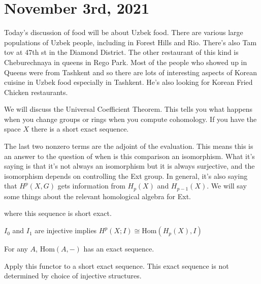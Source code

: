 \documentclass[10pt]{article}
\theoremstyle{definition}
\begin{document}
	\section{November 3rd, 2021}
		Today's discussion of food will be about Uzbek food. There are various large populations of Uzbek people, including in Forest Hills and Rio. There's also Tam tov at 47th st in the Diamond District. The other restaurant of this kind is Cheburechnaya in queens in Rego Park. Most of the people who showed up in Queens were from Tashkent and so there are lots of interesting aspects of Korean cuisine in Uzbek food especially in Tashkent. He's also looking for Korean Fried Chicken restaurants. 
	
	We will discuss the Universal Coefficient Theorem. This tells you what happens when you change groups or rings when you compute cohomology. If you have the space $X$ there is a short exact sequence.
	\begin{center}
	\end{center}
	The last two nonzero terms are the adjoint of the evaluation. This means this is an answer to the question of when is this comparison an isomorphism. What it's saying is that it's not always an isomorphism but it is always surjective, and the isomorphism depends on controlling the Ext group. In general, it's also saying that $H^p(X,G)$ gets information from $H_p(X)$ and $H_{p-1}(X)$. We will say some things about the relevant homological algebra for Ext. 
	\begin{center}
	\end{center}
	where this sequence is short exact. 
	
	$I_0$ and $I_1$ are injective implies $H^p(X;I)\cong \text{Hom}(H_p(X),I)$
	
	For any $A$, $\text{Hom}(A,-)$ has an exact sequence. 
	\begin{center}
	\end{center}
	Apply this functor to a short exact sequence. This exact sequence is not determined by choice of injective structures. 
	
\end{document}
